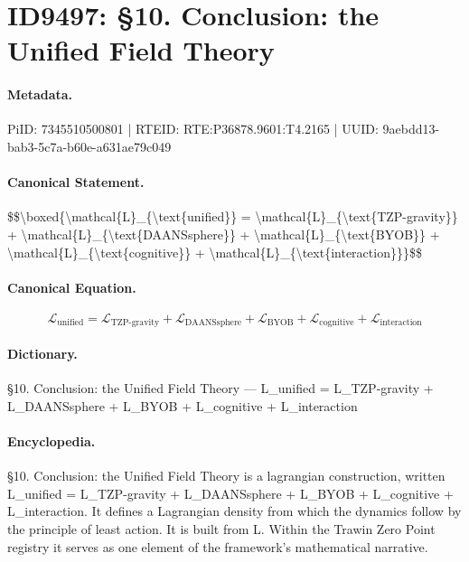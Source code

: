 \section*{ID9497: §10. Conclusion: the Unified Field Theory}
\paragraph{Metadata.}
PiID: 7345510500801 | RTEID: RTE:P36878.9601:T4.2165 | UUID: 9aebdd13-bab3-5c7a-b60e-a631ae79c049

\paragraph{Canonical Statement.}
\$\$\textbackslash{}boxed\{\textbackslash{}mathcal\{L\}\_\{\textbackslash{}text\{unified\}\} = \textbackslash{}mathcal\{L\}\_\{\textbackslash{}text\{TZP-gravity\}\} + \textbackslash{}mathcal\{L\}\_\{\textbackslash{}text\{DAANSsphere\}\} + \textbackslash{}mathcal\{L\}\_\{\textbackslash{}text\{BYOB\}\} + \textbackslash{}mathcal\{L\}\_\{\textbackslash{}text\{cognitive\}\} + \textbackslash{}mathcal\{L\}\_\{\textbackslash{}text\{interaction\}\}\}\$\$

\paragraph{Canonical Equation.}
\[
\boxed{\mathcal{L}_{\text{unified}} = \mathcal{L}_{\text{TZP-gravity}} + \mathcal{L}_{\text{DAANSsphere}} + \mathcal{L}_{\text{BYOB}} + \mathcal{L}_{\text{cognitive}} + \mathcal{L}_{\text{interaction}}}
\]

\paragraph{Dictionary.}
§10. Conclusion: the Unified Field Theory — L\_unified = L\_TZP-gravity + L\_DAANSsphere + L\_BYOB + L\_cognitive + L\_interaction

\paragraph{Encyclopedia.}
§10. Conclusion: the Unified Field Theory is a lagrangian construction, written L\_unified = L\_TZP-gravity + L\_DAANSsphere + L\_BYOB + L\_cognitive + L\_interaction. It defines a Lagrangian density from which the dynamics follow by the principle of least action. It is built from L. Within the Trawin Zero Point registry it serves as one element of the framework's mathematical narrative.
